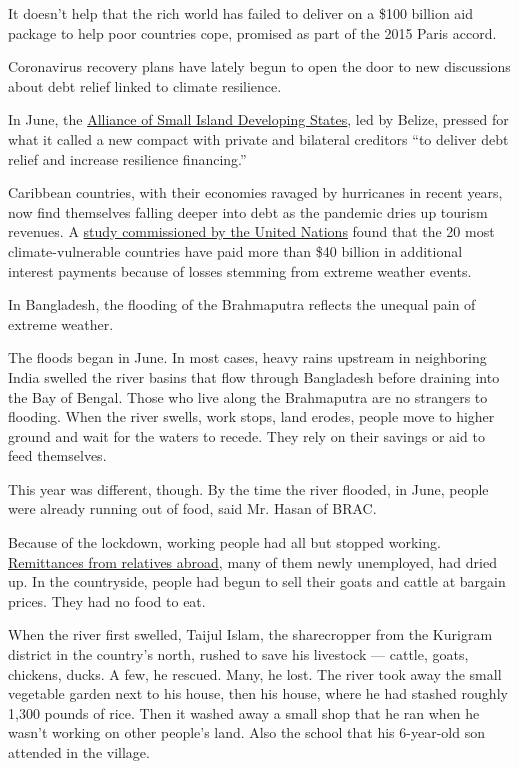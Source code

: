 It doesn't help that the rich world has failed to deliver on a \$100
billion aid package to help poor countries cope, promised as part of the
2015 Paris accord.

Coronavirus recovery plans have lately begun to open the door to new
discussions about debt relief linked to climate resilience.

In June, the
\href{https://www.aosis.org/wp-content/uploads/2020/07/AOSIS-Statement-on-Debt_verJune-29.pdf}{Alliance
of Small Island Developing States}, led by Belize, pressed for what it
called a new compact with private and bilateral creditors ``to deliver
debt relief and increase resilience financing.''

Caribbean countries, with their economies ravaged by hurricanes in
recent years, now find themselves falling deeper into debt as the
pandemic dries up tourism revenues. A
\href{https://unfccc.int/news/climate-change-is-driving-debt-for-developing-countries}{study
commissioned by the United Nations} found that the 20 most
climate-vulnerable countries have paid more than \$40 billion in
additional interest payments because of losses stemming from extreme
weather events.

In Bangladesh, the flooding of the Brahmaputra reflects the unequal pain
of extreme weather.

The floods began in June. In most cases, heavy rains upstream in
neighboring India swelled the river basins that flow through Bangladesh
before draining into the Bay of Bengal. Those who live along the
Brahmaputra are no strangers to flooding. When the river swells, work
stops, land erodes, people move to higher ground and wait for the waters
to recede. They rely on their savings or aid to feed themselves.

This year was different, though. By the time the river flooded, in June,
people were already running out of food, said Mr. Hasan of BRAC.

Because of the lockdown, working people had all but stopped working.
\href{https://www.nytimes.com/2020/07/27/business/global-remittances-coronavirus.html}{Remittances
from relatives abroad}, many of them newly unemployed, had dried up. In
the countryside, people had begun to sell their goats and cattle at
bargain prices. They had no food to eat.

When the river first swelled, Taijul Islam, the sharecropper from the
Kurigram district in the country's north, rushed to save his livestock
--- cattle, goats, chickens, ducks. A few, he rescued. Many, he lost.
The river took away the small vegetable garden next to his house, then
his house, where he had stashed roughly 1,300 pounds of rice. Then it
washed away a small shop that he ran when he wasn't working on other
people's land. Also the school that his 6-year-old son attended in the
village.

